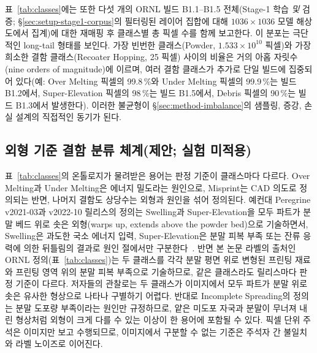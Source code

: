 표~\ref{tab:classes}에는 또한 다섯 개의 ORNL 빌드 B1.1--B1.5
전체(Stage-1 학습 \emph{및} 검증; \S\ref{sec:setup-stage1-corpus}의
필터링된 레이어 집합에 대해 $1036 \times 1036$ 모델 해상도에서
집계)에 대한 재매핑 후 클래스별 총 픽셀 수를 함께 보고한다. 이 분포는 극단적인
long-tail 형태를 보인다. 가장 빈번한 클래스(Powder,
$1.533 \times 10^{10}$ 픽셀)와 가장 희소한 결함 클래스(Recoater
Hopping, 25 픽셀) 사이의 비율은 거의 아홉 자릿수(nine orders of
magnitude)에 이르며, 여러 결함 클래스가 추가로 단일 빌드에 집중되어
있다(예: Over Melting 픽셀의 99.8\,\%와 Under Melting 픽셀의
99.9\,\%는 빌드 B1.2에서, Super-Elevation 픽셀의 98\,\%는 빌드
B1.5에서, Debris 픽셀의 90\,\%는 빌드 B1.3에서 발생한다). 이러한
불균형이 \S\ref{sec:method-imbalance}의 샘플링, 증강, 손실 설계의
직접적인 동기가 된다.

\subsection{외형 기준 결함 분류 체계(제안; 실험 미적용)}
\label{sec:method-taxonomy}

표~\ref{tab:classes}의 온톨로지가 물려받은 용어는 판정 기준이 클래스마다
다르다. Over Melting과 Under Melting은 에너지 밀도라는 원인으로,
Misprint는 CAD 의도로 정의되는 반면, 나머지 결함도 상당수는 외형과
원인을 섞어 정의된다. 예컨대 Peregrine v2021-03과 v2022-10 릴리스의
정의는 Swelling과 Super-Elevation을 모두 파트가 분말 베드 위로 솟은
외형(warps up, extends above the powder bed)으로 기술하면서, Swelling은
과도한 국소 에너지 입력, Super-Elevation은 분말 피복 부족 또는 잔류
응력에 의한 뒤틀림의 결과로 원인 절에서만
구분한다~\cite{Peregrine_v2021_03,Peregrine_v2022_10}. 반면 본 논문
라벨의 출처인 ORNL 정의(표~\ref{tab:classes})는 두 클래스를 각각 분말
평면 위로 변형된 프린팅 재료와 프린팅 영역 위의 분말 피복 부족으로
기술하므로, 같은 클래스라도 릴리스마다 판정 기준이 다르다. 저자들의
관찰로는 두 클래스가 이미지에서 모두 파트가 분말 위로 솟은 유사한
형상으로 나타나 구별하기 어렵다. 반대로 Incomplete Spreading의 정의는
분말 도포량 부족이라는 원인만 규정하므로, 얕은 미도포 자국과 분말이
무너져 내린 형상처럼 외형이 크게 다를 수 있는 이상이 한 용어에 포함될
수 있다. 픽셀 단위 주석은 이미지만 보고 수행되므로, 이미지에서 구분할
수 없는 기준은 주석자 간 불일치와 라벨 노이즈로 이어진다.

